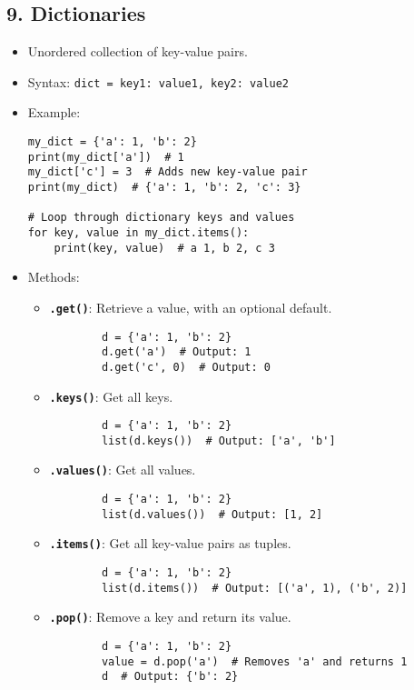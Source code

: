 \subsection*{9. Dictionaries}
\begin{itemize}
    \item Unordered collection of key-value pairs.
    \item Syntax: \texttt{dict = {key1: value1, key2: value2}}
    \item Example:
    \begin{verbatim}
my_dict = {'a': 1, 'b': 2}
print(my_dict['a'])  # 1
my_dict['c'] = 3  # Adds new key-value pair
print(my_dict)  # {'a': 1, 'b': 2, 'c': 3}

# Loop through dictionary keys and values
for key, value in my_dict.items():
    print(key, value)  # a 1, b 2, c 3
    \end{verbatim}
    \item Methods:
    \begin{itemize}
        \item \textbf{\texttt{.get()}}: Retrieve a value, with an optional default.
        \begin{verbatim}
        d = {'a': 1, 'b': 2}
        d.get('a')  # Output: 1
        d.get('c', 0)  # Output: 0
        \end{verbatim}
        \item \textbf{\texttt{.keys()}}: Get all keys.
        \begin{verbatim}
        d = {'a': 1, 'b': 2}
        list(d.keys())  # Output: ['a', 'b']
        \end{verbatim}
        \item \textbf{\texttt{.values()}}: Get all values.
        \begin{verbatim}
        d = {'a': 1, 'b': 2}
        list(d.values())  # Output: [1, 2]
        \end{verbatim}
        \item \textbf{\texttt{.items()}}: Get all key-value pairs as tuples.
        \begin{verbatim}
        d = {'a': 1, 'b': 2}
        list(d.items())  # Output: [('a', 1), ('b', 2)]
        \end{verbatim}
        \item \textbf{\texttt{.pop()}}: Remove a key and return its value.
        \begin{verbatim}
        d = {'a': 1, 'b': 2}
        value = d.pop('a')  # Removes 'a' and returns 1
        d  # Output: {'b': 2}

\end{verbatim}
\end{itemize}
\end{itemize}
